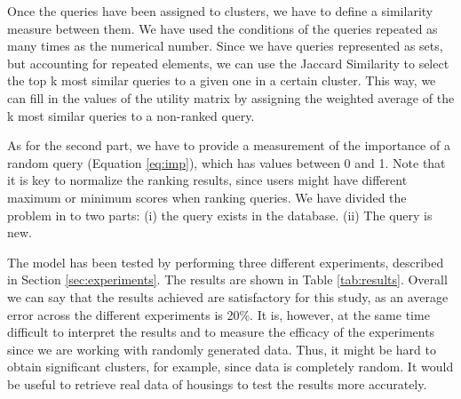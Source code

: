 \documentclass[sigconf]{acmart}
\begin{document}
Once the queries have been assigned to clusters, we have to define a similarity measure between them. We have used the conditions of the queries repeated as many times as the numerical number. Since we have queries represented as sets, but accounting for repeated elements, we can use the Jaccard Similarity to select the top k most similar queries to a given one in a certain cluster. This way, we can fill in the values of the utility matrix by assigning the weighted average of the k most similar queries to a non-ranked query.

As for the second part, we have to provide a measurement of the importance of a random query (Equation \ref{eq:imp}), which has values between 0 and 1. Note that it is key to normalize the ranking results, since users might have different maximum or minimum scores when ranking queries. We have divided the problem in to two parts: (i) the query exists in the database. (ii) The query is new.

The model has been tested by performing three different experiments, described in Section \ref{sec:experiments}. The results are shown in Table \ref{tab:results}. Overall we can say that the results achieved are satisfactory for this study, as an average error across the different experiments is 20\%. It is, however, at the same time difficult to interpret the results and to measure the efficacy of the experiments since we are working with randomly generated data. Thus, it might be hard to obtain significant clusters, for example, since data is completely random. It would be useful to retrieve real data of housings to test the results more accurately. 





\appendix
\end{document}
